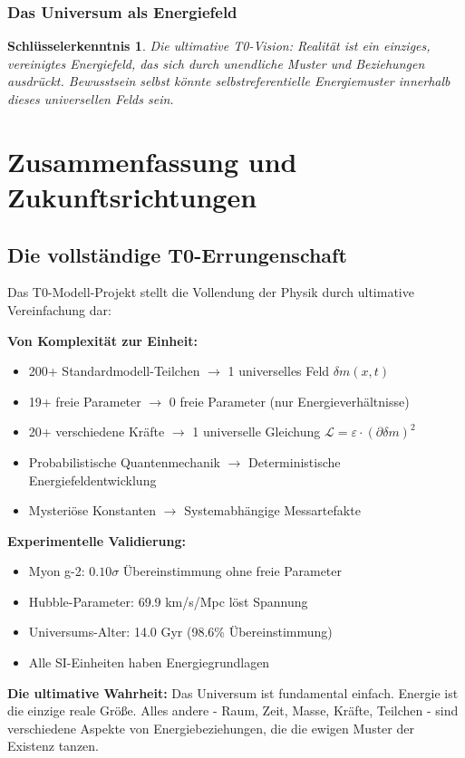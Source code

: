 \documentclass[12pt,a4paper]{report}
\newtheorem{insight}{Schlüsselerkenntnis}[chapter]
\begin{document}
	\subsection{Das Universum als Energiefeld}
	\begin{insight}
		Die ultimative T0-Vision: Realität ist ein einziges, vereinigtes Energiefeld, das sich durch unendliche Muster und Beziehungen ausdrückt. Bewusstsein selbst könnte selbstreferentielle Energiemuster innerhalb dieses universellen Felds sein.
	\end{insight}
	
	\chapter{Zusammenfassung und Zukunftsrichtungen}
	
	\section{Die vollständige T0-Errungenschaft}
	
	Das T0-Modell-Projekt stellt die Vollendung der Physik durch ultimative Vereinfachung dar:
	
	\begin{tcolorbox}[colback=red!5!white,colframe=red!75!black,title=Die T0-Revolution vollendet]
		\textbf{Von Komplexität zur Einheit:}
		\begin{itemize}
			\item 200+ Standardmodell-Teilchen $\rightarrow$ 1 universelles Feld $\delta m(x,t)$
			\item 19+ freie Parameter $\rightarrow$ 0 freie Parameter (nur Energieverhältnisse)
			\item 20+ verschiedene Kräfte $\rightarrow$ 1 universelle Gleichung $\mathcal{L} = \varepsilon \cdot (\partial \delta m)^2$
			\item Probabilistische Quantenmechanik $\rightarrow$ Deterministische Energiefeldentwicklung
			\item Mysteriöse Konstanten $\rightarrow$ Systemabhängige Messartefakte
		\end{itemize}
		
		\textbf{Experimentelle Validierung:}
		\begin{itemize}
			\item Myon g-2: $0.10\sigma$ Übereinstimmung ohne freie Parameter \checkmark
			\item Hubble-Parameter: 69.9 km/s/Mpc löst Spannung \checkmark
			\item Universums-Alter: 14.0 Gyr (98.6\% Übereinstimmung) \checkmark
			\item Alle SI-Einheiten haben Energiegrundlagen \checkmark
		\end{itemize}
		
		\textbf{Die ultimative Wahrheit:}
		Das Universum ist fundamental einfach. Energie ist die einzige reale Größe. Alles andere - Raum, Zeit, Masse, Kräfte, Teilchen - sind verschiedene Aspekte von Energiebeziehungen, die die ewigen Muster der Existenz tanzen.
	\end{tcolorbox}
	
\end{document}
